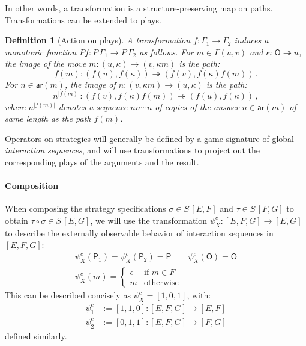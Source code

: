 \documentclass[draft,11pt]{report}
\newtheorem{definition}{Definition}
\newcommand{\kw}[1]{\ensuremath{ \mathsf{#1} }}
\begin{document}
In other words,
a transformation
is a structure-preserving map on paths.
Transformations can be extended to plays.

\begin{definition}[Action on plays]
A transformation
$f : \Gamma_1 \rightarrow \Gamma_2$
induces a monotonic function
$P f  : P \, \Gamma_1 \rightarrow P \, \Gamma_2$
as follows.
For $m \in \Gamma(u, v)$ and $\kappa : \kw{O} \twoheadrightarrow u$,
the image of the move
$m : (u, \kappa) \rightarrow (v, \kappa m)$
is the path:
\[
 f(m) : (f(u), f(\kappa)) \twoheadrightarrow
        (f(v), f(\kappa) f(m)) \,.
\]
For $n \in \kw{ar}(m)$,
the image of
$n : (v, \kappa m) \rightarrow (u, \kappa)$
is the path:
\[
 n^{|f(m)|} : (f(v), f(\kappa) f(m)) \twoheadrightarrow
              (f(u), f(\kappa)) \,,
\]
where $n^{|f(m)|}$ denotes a sequence $nn \cdots n$
of copies of the answer $n \in \kw{ar}(m)$
of same length as the path $f(m)$.
\end{definition}

Operators on strategies will generally be defined
by a game signature of global \emph{interaction sequences},
and will use transformations to project out
the corresponding plays of the arguments and the result.

\paragraph{Composition} %

When composing the strategy specifications
$\sigma \in S \, [E, F]$ and
$\tau \in S \, [F, G]$
to obtain $\tau \circ \sigma \in S \, [E, G]$,
we will use the transformation
$\psi^c_X : [E,F,G] \rightarrow [E,G]$
to describe the externally observable behavior
of interaction sequences in $[E,F,G]$:
\begin{gather*}
  \psi^c_X(\kw{P}_1) = \psi^c_X(\kw{P}_2) = \kw{P} \qquad
  \psi^c_X(\kw{O}) = \kw{O}
  \\
  \psi^c_X(m) = \begin{cases}
    \epsilon & \text{if } m \in F \\
    m & \text{otherwise}
  \end{cases}
\end{gather*}
This can be described concisely as
$\psi^c_X = [1,0,1]$,
with:
\begin{align*}
  \psi^c_1 &:= [1,1,0] :
    [E,F,G] \rightarrow [E,F] \\
  \psi^c_2 &:= [0,1,1] :
     [E,F,G] \rightarrow [F,G]
\end{align*}
defined similarly.
\end{document}
